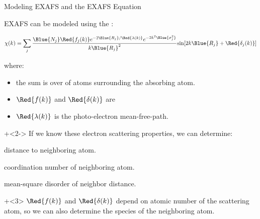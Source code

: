 \begin{slide}{Modeling EXAFS and the EXAFS Equation}

 EXAFS can be modeled using the {}:
  \vspace{-1mm}

  \begin{center}
    \[ \chi(k) = \sum_j {\frac{{\Blue{N_j}} {\Red{f_j(k)}}
        e^{-2{\Blue{R_j}}/{\Red{\lambda(k)}}}
        e^{-2k^2{\Blue{\sigma_j^2}}}}{k{\Blue{R_j}}^2}
      {\sin[{2k{\Blue{R_j}} + {\Red{\delta_j(k)}}] }}} \]
  \end{center}

  \vmm

  where:
  \begin{itemize}
  \item the sum is over {}  of atoms surrounding the
    absorbing atom.
  \item $\Red{f(k)}$ and $\Red{\delta(k)}$ are
    {}
  \item $ \Red{\lambda(k)} $ is the photo-electron mean-free-path.
  \end{itemize}

  \vmm
  \onslide+<2->
  If we know these electron scattering properties, we can determine:
  \begin{description}
      \settowidth{\labelwidth}{15mm}
      \setlength{\itemindent}{15mm}
      \setlength{\leftmargin}{15mm}
    \item[$R$] distance to neighboring atom.
    \item[$N$] coordination number of neighboring atom.
    \item[$\sigma^2$] mean-square disorder of neighbor distance.
    \end{description}

  \vmm

  \onslide+<3>
  ${\Red{f(k)}}$ and ${\Red{\delta(k)}}$ depend on atomic number
  {} of the scattering atom, so we can also determine the
  species of the neighboring atom.

\end{slide}


